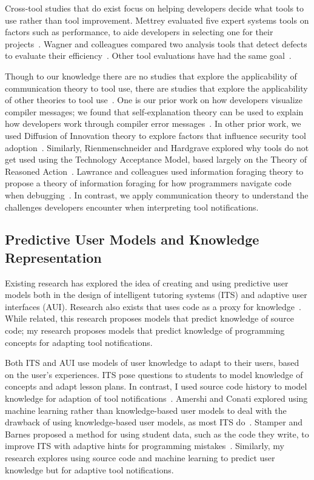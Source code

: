 \documentclass{llncs}
\begin{document}
Cross-tool studies that do exist focus on helping developers decide what tools to use rather than tool improvement.
Mettrey evaluated five expert systems tools on factors such as performance, to aide developers in selecting one for their projects~\cite{mettrey1991comparative}.
Wagner and colleagues compared two analysis tools that detect defects to evaluate their efficiency~\cite{wagner2008evaluation}.
Other tool evaluations have had the same goal~\cite{roy2009comparison,zheng2006value}.

Though to our knowledge there are no studies that explore the applicability of communication theory to tool use, there are studies that explore the applicability of other theories to tool use~\cite{barik14,xiao2014social,riemenschneider2001explaining}.  
One is our prior work on how developers visualize compiler messages; we found that self-explanation theory can be used to explain how developers work through compiler error messages~\cite{barik14}. 
In other prior work, we used Diffusion of Innovation theory to explore factors that influence 
security tool adoption~\cite{xiao2014social}. 
Similarly, Rienmenschneider and Hardgrave explored why tools do not get used using the Technology Acceptance Model, based largely on the Theory of Reasoned Action~\cite{riemenschneider2001explaining}.
Lawrance and colleagues used information foraging theory to propose a theory of information foraging for how programmers navigate code when debugging~\cite{lawrance2013programmers}. 
In contrast, we apply communication theory to understand the challenges 
developers encounter when interpreting tool notifications.

\subsection{Predictive User Models and Knowledge Representation}
Existing research has explored the idea of creating and using predictive user models both in the design of intelligent tutoring systems (ITS) and adaptive user interfaces (AUI). Research also exists that uses code as a proxy for knowledge~\cite{fritz2010degree}. While related, this research proposes models that predict knowledge of source code; my research proposes models that predict knowledge of programming concepts for adapting tool notifications.

Both ITS and AUI use models of user knowledge to adapt to their users, based on the user's experiences.
ITS pose questions to students to model knowledge of concepts and adapt lesson plans. In contrast, I used source code history to model knowledge for adaption of tool notifications~\cite{murray1999authoring}.
Amershi and Conati explored using machine learning rather than knowledge-based user models to deal with the drawback of using knowledge-based user models, as most ITS do~\cite{amershi2007unsupervised}. 
Stamper and Barnes proposed a method for using student data, such as the code they write, to improve ITS with adaptive hints for programming mistakes~\cite{stamper2009unsupervised}.
Similarly, my research explores using source code and machine learning to predict user knowledge but for adaptive tool notifications.
\end{document}
